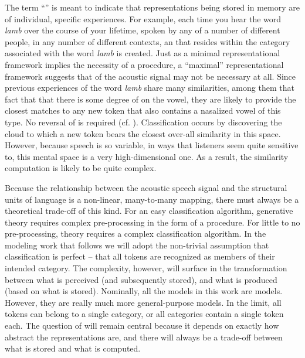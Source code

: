 The term ``'' is meant to indicate that representations being\largerpage
stored in memory are of individual, specific experiences. For example,
each time you hear the word \textit{lamb} over the course of your lifetime,
spoken by any of a number of different people, in any number of different
contexts, an  that resides within the category associated
with the word \textit{lamb} is created. Just as a minimal representational
framework implies the necessity of a  procedure, a “maximal”
representational framework suggests that  of the acoustic
signal may not be necessary at all. Since previous experiences of
the word \textit{lamb} share many similarities, among them that fact
that that there is some degree of  on the vowel, they
are likely to provide the closest matches to any new token that also
contains a nasalized vowel of this type. No reversal of 
is required (cf. \citealt{Johnson1997a}). Classification occurs by
discovering the cloud to which a new token bears the closest over-all
similarity in this space. However, because speech is so variable,
in ways that listeners seem quite sensitive to, this mental space
is a very high-dimensional one. As a result, the similarity computation
is likely to be quite complex. 

Because the relationship between the acoustic speech signal and the
structural units of language is a non-linear, many-to-many mapping,
there must always be a theoretical trade-off of this kind. For an
easy classification algorithm, generative theory requires complex
pre-processing in the form of a  procedure. For little
to no pre-processing,  theory requires a complex classification
algorithm. In the modeling work that follows we will adopt the non-trivial
assumption that classification is perfect – that all tokens are recognized
as members of their intended category. The complexity, however, will
surface in the transformation between what is perceived (and subsequently
stored), and what is produced (based on what is stored). Nominally,
all the models in this work are  models. However, they are
really much more general-purpose models. In the limit, all tokens
can belong to a single category, or all categories contain a single
token each. The question of  will remain central because
it depends on exactly how abstract the representations are, and there
will always be a trade-off between what is stored and what is computed. 
